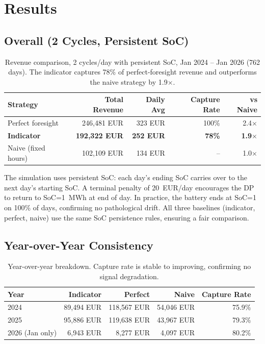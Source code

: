 \documentclass[11pt,a4paper]{article}
\begin{document}
\section{Results}

\subsection{Overall (2 Cycles, Persistent SoC)}

\begin{table}[H]
\centering
\begin{tabular}{lrrrr}
\toprule
\textbf{Strategy} & \textbf{Total Revenue} & \textbf{Daily Avg} & \textbf{Capture Rate} & \textbf{vs Naive} \\
\midrule
Perfect foresight & 246,481 EUR & 323 EUR & 100\% & 2.4$\times$ \\
\textbf{Indicator} & \textbf{192,322 EUR} & \textbf{252 EUR} & \textbf{78\%} & \textbf{1.9$\times$} \\
Naive (fixed hours) & 102,109 EUR & 134 EUR & -- & 1.0$\times$ \\
\bottomrule
\end{tabular}
\caption{Revenue comparison, 2 cycles/day with persistent SoC, Jan 2024 -- Jan 2026 (762 days). The indicator captures 78\% of perfect-foresight revenue and outperforms the naive strategy by 1.9$\times$.}
\end{table}

The simulation uses persistent SoC: each day's ending SoC carries over to the next day's starting SoC. A terminal penalty of 20~EUR/day encourages the DP to return to SoC=1~MWh at end of day. In practice, the battery ends at SoC=1 on 100\% of days, confirming no pathological drift. All three baselines (indicator, perfect, naive) use the same SoC persistence rules, ensuring a fair comparison.

\subsection{Year-over-Year Consistency}

\begin{table}[H]
\centering
\begin{tabular}{lrrrr}
\toprule
\textbf{Year} & \textbf{Indicator} & \textbf{Perfect} & \textbf{Naive} & \textbf{Capture Rate} \\
\midrule
2024 & 89,494 EUR & 118,567 EUR & 54,046 EUR & 75.9\% \\
2025 & 95,886 EUR & 119,638 EUR & 43,967 EUR & 79.3\% \\
2026 (Jan only) & 6,943 EUR & 8,277 EUR & 4,097 EUR & 80.2\% \\
\bottomrule
\end{tabular}
\caption{Year-over-year breakdown. Capture rate is stable to improving, confirming no signal degradation.}
\end{table}
\end{document}
